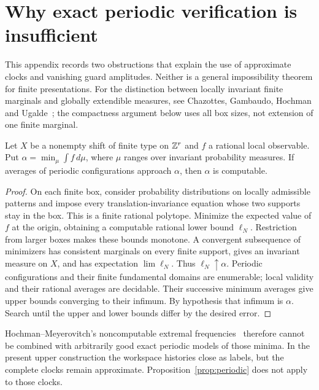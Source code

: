 \section{Why exact periodic verification is insufficient}\label{sec:obstructions}
This appendix records two obstructions that explain the use of approximate clocks and vanishing guard amplitudes. Neither is a general impossibility theorem for finite presentations. For the distinction between locally invariant finite marginals and globally extendible measures, see Chazottes, Gambaudo, Hochman and Ugalde~\cite{CGHU12}; the compactness argument below uses all box sizes, not extension of one finite marginal.

\begin{proposition}\label{prop:periodic}
Let $X$ be a nonempty shift of finite type on $\mathbb Z^r$ and $f$ a rational local observable. Put $\alpha=\min_\mu\int f\,d\mu$, where $\mu$ ranges over invariant probability measures. If averages of periodic configurations approach $\alpha$, then $\alpha$ is computable.
\end{proposition}
\begin{proof}
On each finite box, consider probability distributions on locally admissible patterns and impose every translation-invariance equation whose two supports stay in the box. This is a finite rational polytope. Minimize the expected value of $f$ at the origin, obtaining a computable rational lower bound $\ell_N$. Restriction from larger boxes makes these bounds monotone. A convergent subsequence of minimizers has consistent marginals on every finite support, gives an invariant measure on $X$, and has expectation $\lim\ell_N$. Thus $\ell_N\uparrow\alpha$. Periodic configurations and their finite fundamental domains are enumerable; local validity and their rational averages are decidable. Their successive minimum averages give upper bounds converging to their infimum. By hypothesis that infimum is $\alpha$. Search until the upper and lower bounds differ by the desired error.
\end{proof}

Hochman--Meyerovitch's noncomputable extremal frequencies~\cite{HM10} therefore cannot be combined with arbitrarily good exact periodic models of those minima. In the present upper construction the workspace histories close as labels, but the complete clocks remain approximate. Proposition~\ref{prop:periodic} does not apply to those clocks.

